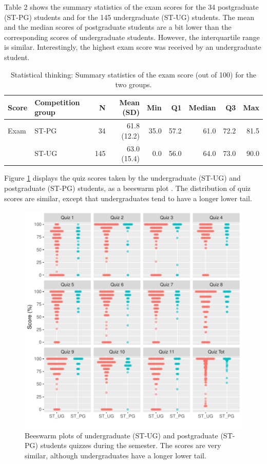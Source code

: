 \documentclass[12pt]{article}
\begin{document}
Table 2 shows the summary statistics of the exam scores for the 34
postgraduate (ST-PG) students and for the 145 undergraduate (ST-UG)
students. The mean and the median scores of postgraduate students are a
bit lower than the corresponding scores of undergraduate students.
However, the interquartile range is similar. Interestingly, the highest
exam score was received by an undergraduate student.

\begin{table}[h]
\begin{center}
\begin{tabular}{l l | r | r | r r r r r}\hline
Score & Competition group & N & Mean (SD)   & Min  &  Q1 & Median  &  Q3  & Max \\\hline
Exam   & ST-PG      & 34  & 61.8 (12.2)  &  35.0 & 57.2  &   61.0  & 72.2  & 81.5 \\
       & ST-UG         & 145 & 63.0 (15.4)  &   0.0 & 56.0  &   64.0  & 73.0   & 90.0\\\hline
\end{tabular}
\caption{Statistical thinking: Summary statistics of the exam score (out of 100) for the two groups.}
\end{center}
\label{tab:Melb_Group_Compare}
\end{table}

Figure \ref{fig:Monash_quiz} displays the quiz scores taken by the
undergraduate (ST-UG) and postgraduate (ST-PG) students, as a beeswarm
plot \citep{beeswarm}. The distribution of quiz scores are similar,
except that undergraduates tend to have a longer lower tail.

\begin{figure}
\centering
\includegraphics{paper-kaggle_files/figure-latex/Monash_quiz-1.pdf}
\caption{\label{fig:Monash_quiz}Beeswarm plots of undergraduate (ST-UG)
and postgraduate (ST-PG) students quizzes during the semester. The
scores are very similar, although undergraduates have a longer lower
tail.}
\end{figure}
\end{document}
